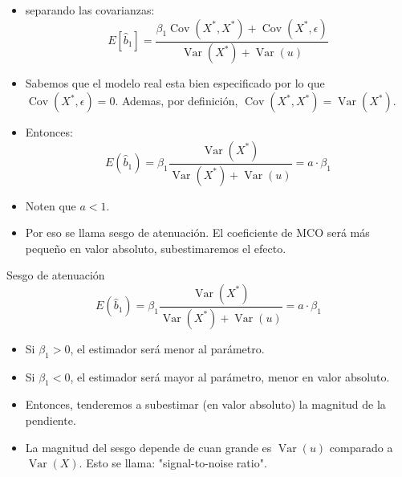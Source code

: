 \documentclass[10pt]{beamer}
\begin{document}
\begin{frame}
    \begin{itemize}
        \item separando las covarianzas:
        $$
        E\left[\hat{b}_{1}\right]=\frac{\beta_{1} \operatorname{Cov}\left(X^{*}, X^{*}\right)+\operatorname{Cov}\left(X^{*}, \epsilon\right)}{\operatorname{Var}\left(X^{*}\right)+\operatorname{Var}(u)}
        $$
        \item Sabemos que el modelo real esta bien especificado por lo que $\operatorname{Cov}\left(X^{*}, \epsilon\right)=0$. Ademas, por definici\'on, $\operatorname{Cov}\left(X^{*}, X^{*}\right)=\operatorname{Var}\left(X^{*}\right)$.
        \item Entonces:
        $$
        E\left(\hat{b}_{1}\right)=\beta_{1} \frac{\operatorname{Var}\left(X^{*}\right)}{\operatorname{Var}\left(X^{*}\right)+\operatorname{Var}(u)}=a \cdot \beta_{1}
        $$
        \item Noten que $a<1$.
        \item Por eso se llama sesgo de atenuaci\'on. El coeficiente de MCO ser\'a m\'as pequeño en valor absoluto, subestimaremos el efecto.
    \end{itemize}
\end{frame}

\begin{frame}{Sesgo de atenuación}
    $$
    E\left(\hat{b}_{1}\right)=\beta_{1} \frac{\operatorname{Var}\left(X^{*}\right)}{\operatorname{Var}\left(X^{*}\right)+\operatorname{Var}(u)}=a \cdot\beta_{1}
    $$
    \begin{itemize}
        \item Si $\beta_{1}>0$, el estimador será menor al par\'ametro.
        \item Si $\beta_{1}<0$, el estimador será mayor al par\'ametro, menor en valor absoluto.
        \item Entonces, tenderemos a subestimar (en valor absoluto) la magnitud de la pendiente.
        \item La magnitud del sesgo depende de cuan grande es $\operatorname{Var}(u)$ comparado a $\operatorname{Var}(X)$. Esto se llama: "signal-to-noise ratio".
    \end{itemize}
\end{frame}

\end{document}
